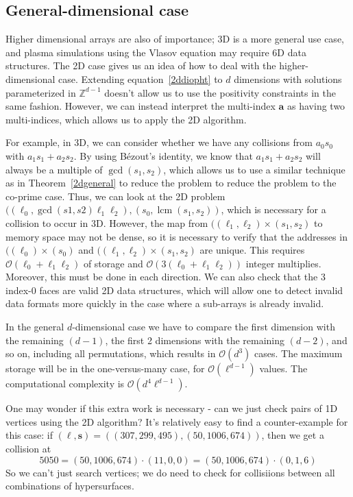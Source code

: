 \documentclass[twocolumn,10pt,notitlepage]{article}
\DeclareMathOperator{\lcm}{lcm}
\begin{document}
\subsection{General-dimensional case}

Higher dimensional arrays are also of importance; 3D is a more general
use case, and plasma simulations using the Vlasov equation may require
6D data structures.  The 2D case gives us an idea of how to deal with
the higher-dimensional case.  Extending equation~\eqref{2ddiopht} to
$d$ dimensions with solutions parameterized in $\mathbb{Z}^{d-1}$
doesn't allow us to use the positivity constraints in the same
fashion.  However, we can instead interpret the multi-index $\bm{a}$
as having two multi-indices, which allows us to apply the 2D algorithm.

For example, in 3D, we can consider whether we have any collisions
from $a_0s_0$ with $a_1s_1 + a_2s_2$.  By using Bézout's identity, we
know that $a_1s_1 + a_2s_2$ will always be a multiple of
$\gcd(s_1,s_2)$, which allows us to use a similar technique as in
Theorem~\ref{2dgeneral} to reduce the problem to reduce the problem to
the co-prime case.  Thus, we can look at the 2D problem $((\ell_0,
\gcd(s1,s2)\ell_1\ell_2),(s_0,\lcm(s_1,s_2))$, which is necessary for
a collision to occur in 3D. However, the map from
$((\ell_1,\ell_2)\times{}(s_1,s_2)$ to memory space may not be dense,
so it is necessary to verify that the addresses in
$((\ell_0)\times{}(s_0)$ and $((\ell_1,\ell_2)\times{}(s_1,s_2)$ are
unique.  This requires $\mathcal{O}(\ell_0 +\ell_1\ell_2)$ of storage
and $\mathcal{O}(3(\ell_0 +\ell_1\ell_2))$ integer multiplies.
Moreover, this must be done in each direction.  We can also check that
the 3 index-$0$ faces are valid 2D data structures, which will allow
one to detect invalid data formats more quickly in the case where a
sub-arrays is already invalid.

In the general $d$-dimensional case we have to compare the first
dimension with the remaining $(d-1)$, the first 2 dimensions with the
remaining $(d-2)$, and so on, including all permutations, which
results in $\mathcal{O}(d^3)$ cases.  The maximum storage will be in
the one-versus-many case, for $\mathcal{O}(\ell^{d-1})$ values.  The
computational complexity is $\mathcal{O}(d^4 \ell^{d-1})$.

One may wonder if this extra work is necessary - can we just check
pairs of 1D vertices using the 2D algorithm?  It's relatively easy to
find a counter-example for this case: if
$\left(\bm\ell,\bm{s}\right)=\left(\left( 307, 299, 495 \right), \left(
50, 1006, 674 \right)\right)$, then we get a collision at
\begin{dmath}
  5050
  = \left(50, 1006, 674 \right) \cdot \left(11, 0, 0  \right)
  = \left(50, 1006, 674 \right) \cdot \left(0, 1, 6  \right)
\end{dmath}
So we can't just search vertices; we do need to check for collisiions
between all combinations of hypersurfaces.
\end{document}
